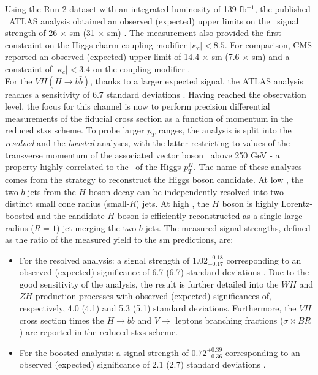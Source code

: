 Using the Run 2 dataset with an integrated luminosity of 139 fb$^{-1}$, the published \vhc\ ATLAS analysis obtained an observed (expected) upper limits on the \vhc\ signal strength of 26 $\times$ \gls{sm} (31 $\times$ \gls{sm}) \cite{Collaboration:2721696}. The measurement also provided the first constraint on the Higgs-charm coupling modifier $|\kappa_c| < 8.5$. For comparison, CMS reported an observed (expected) upper limit of 14.4 $\times$ \gls{sm} (7.6 $\times$ \gls{sm}) and a constraint of $|\kappa_c| < 3.4 $ on the coupling modifier \cite{arXiv:2205.05550}. \\ 

For the $VH (H\rightarrow b\bar{b})$, thanks to a larger expected signal, the ATLAS analysis reaches a sensitivity of 6.7 standard deviations \cite{ATLAS:2020fcp}. Having reached the observation level, the focus for this channel is now to perform precision differential measurements of the fiducial cross section as a function of momentum in the reduced \gls{stxs} scheme. To probe larger $p_T$ ranges, the analysis is split into the \textit{resolved} \cite{ATLAS:2020fcp} and the \textit{boosted} \cite{ATLAS:2020jwz} analyses, with the latter restricting to values of the transverse momentum of the associated vector boson \ptv\ above 250 GeV - a property highly correlated to the \pt\ of the Higgs $p_T^H$. The name of these analyses comes from the strategy to reconstruct the Higgs boson candidate. At low \ptv, the two $b$-jets from the $H$ boson decay can be independently resolved into two distinct small cone radius (small-$R$) jets. At high \ptv, the $H$ boson is highly Lorentz-boosted and the candidate $H$ boson is efficiently reconstructed as a single large-radius ($R = 1$) jet merging the two $b$-jets. The measured signal strengths, defined as the ratio of the measured yield to the \gls{sm} predictions, are: 
\begin{itemize}
\item For the resolved analysis: a signal strength of $1.02_{-0.17}^{+0.18}$ corresponding to an observed (expected) significance of 6.7 (6.7) standard deviations \cite{ATLAS:2020fcp}. Due to the good sensitivity of the analysis, the result is further detailed into the $WH$ and $ZH$ production processes with observed (expected) significances of, respectively, 4.0 (4.1) and 5.3 (5.1) standard deviations. Furthermore, the $VH$ cross section times the $H \rightarrow b\bar{b}$ and $V\rightarrow$ leptons branching fractions ($\sigma \times BR$) are reported in the reduced \gls{stxs} scheme.
\item For the boosted analysis: a signal strength of  $0.72_{-0.36}^{+0.39}$ corresponding to an observed (expected) significance of 2.1 (2.7) standard deviations \cite{ATLAS:2020jwz}.
\end{itemize}

